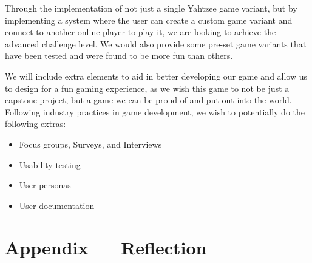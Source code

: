 \documentclass{article}
\begin{document}
Through the implementation of not just a single Yahtzee game variant, but by implementing a system where the user can create a custom game variant and connect to another online player to play it, we are looking to achieve the advanced challenge level. We would also provide some pre-set game variants that have been tested and were found to be more fun than others.

We will include extra elements to aid in better developing our game and allow us to design for a fun gaming experience, as we wish this game to not be just a capstone project, but a game we can be proud of and put out into the world. Following industry practices in game development, we wish to potentially do the following extras:

\begin{itemize}
	\item Focus groups, Surveys, and Interviews
	\item Usability testing
	\item User personas
	\item User documentation
\end{itemize}

\newpage{}

\section*{Appendix --- Reflection}


%
\end{document}
